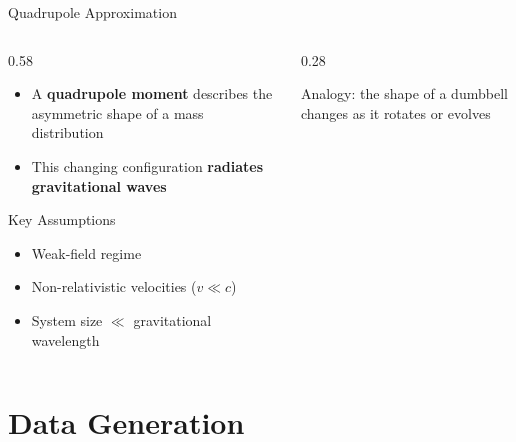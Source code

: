 \documentclass[aspectratio=169]{beamer}
\begin{document}
\begin{frame}{Quadrupole Approximation}
  \begin{columns}
    \begin{column}{0.58\textwidth}
      \begin{itemize}
        \item A \textbf{quadrupole moment} describes the asymmetric shape of a mass distribution
        \vspace{0.2cm}
        \item This changing configuration \textbf{radiates gravitational waves} \parencite{Creighton2026}
      \end{itemize}
      \vspace{0.4cm}
      \begin{block}{Key Assumptions}
        \begin{itemize}
          \item Weak-field regime
          \item Non-relativistic velocities ($v \ll c$)
          \item System size $\ll$ gravitational wavelength
        \end{itemize}
      \end{block}
    \end{column}
    \begin{column}{0.28\textwidth}
      \hfill
      \vspace{0.3cm}
      \begin{flushright}
        {\small Analogy: the shape of a dumbbell changes as it rotates or evolves}
      \end{flushright}
    \end{column}
  \end{columns}
\end{frame}

\section{Data Generation}
\end{document}
